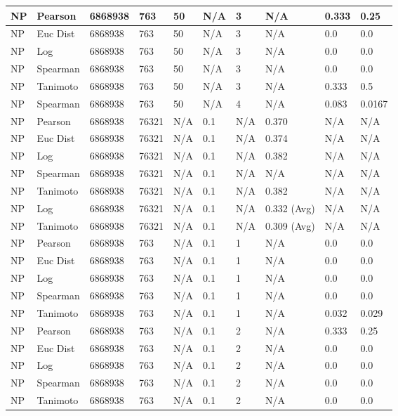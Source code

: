 \documentclass{article}
\begin{document}
\begin{longtable}{ |p{1.7cm}|p{1.9cm}|p{1.5cm}|p{1.5cm}|p{0.75cm}|p{0.75cm}|p{0.75cm}|p{0.75cm}|p{1.5cm}|p{1.5cm}|}
    NP & Pearson & 6868938 & 763 & 50&  N/A & 3 & N/A & 0.333 & 0.25  \\ \hline
    NP & Euc Dist & 6868938 & 763 & 50 & N/A & 3  & N/A &0.0 & 0.0   \\ \hline
    NP & Log & 6868938 & 763 & 50 &  N/A & 3  & N/A & 0.0 & 0.0  \\ \hline
    NP & Spearman & 6868938 & 763 & 50 & N/A & 3  & N/A &0.0 & 0.0 \\ \hline
    NP & Tanimoto & 6868938 & 763 & 50 & N/A & 3 & N/A & 0.333 & 0.5 \\ \hline
    NP & Spearman & 6868938 & 763 & 50 & N/A &  4 & N/A & 0.083 & 0.0167 \\ \hline
    
    NP & Pearson & 6868938 & 76321 & N/A &  0.1 & N/A & 0.370 & N/A & N/A  \\ \hline
    NP & Euc Dist & 6868938 & 76321 & N/A &  0.1 & N/A & 0.374 & N/A & N/A   \\ \hline
    NP & Log & 6868938 & 76321 & N/A &  0.1 & N/A & 0.382 & N/A & N/A  \\ \hline
    NP & Spearman & 6868938 & 76321 & N/A &  0.1 & N/A & N/A & N/A & N/A \\ \hline
    NP & Tanimoto & 6868938 & 76321 & N/A &  0.1 & N/A & 0.382 & N/A & N/A \\ \hline
    NP & Log & 6868938 & 76321 & N/A &  0.1 & N/A & 0.332 (Avg) & N/A & N/A \\ \hline
    NP & Tanimoto & 6868938 & 76321 & N/A &  0.1 & N/A & 0.309 (Avg) & N/A & N/A \\ \hline
    
    NP & Pearson & 6868938 & 763 & N/A &  0.1 & 1 & N/A & 0.0 & 0.0  \\ \hline
    NP & Euc Dist & 6868938 & 763 & N/A &  0.1 & 1 & N/A &0.0 & 0.0   \\ \hline
    NP & Log & 6868938 & 763 & N/A &  0.1 & 1 & N/A & 0.0 & 0.0  \\ \hline
    NP & Spearman & 6868938 & 763 & N/A &  0.1 & 1 & N/A &0.0 & 0.0 \\ \hline
    NP & Tanimoto & 6868938 & 763 & N/A &  0.1 & 1 & N/A & 0.032 & 0.029 \\ \hline
    
    NP & Pearson & 6868938 & 763 & N/A &  0.1 & 2 & N/A & 0.333 & 0.25  \\ \hline
    NP & Euc Dist & 6868938 & 763 & N/A &  0.1 &  2 & N/A &0.0 & 0.0   \\ \hline
    NP & Log & 6868938 & 763 & N/A &  0.1 &  2 & N/A & 0.0 & 0.0 \\ \hline
    NP & Spearman & 6868938 & 763 & N/A &  0.1 &  2 & N/A & 0.0 & 0.0 \\ \hline
    NP & Tanimoto & 6868938 & 763 & N/A &  0.1 &  2 & N/A & 0.0 & 0.0 \\ \hline
    

\end{longtable}
\end{document}
